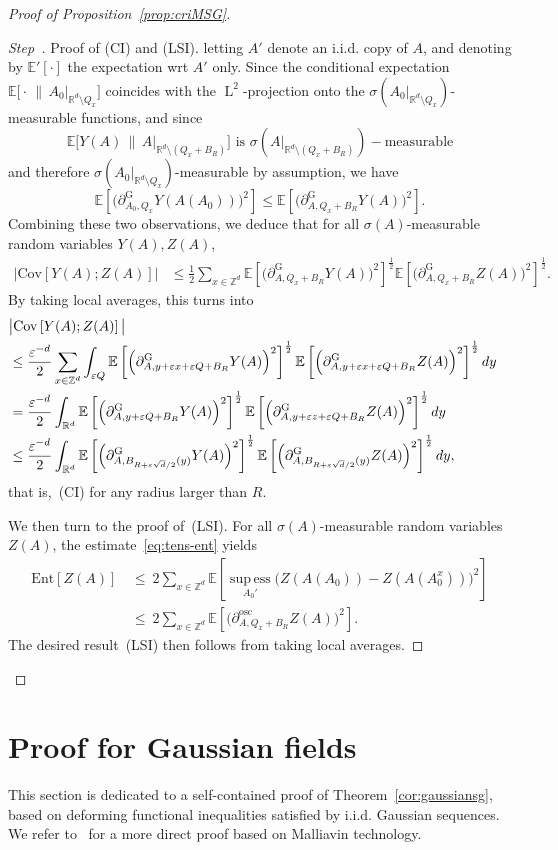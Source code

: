 \documentclass[AHL,Unicode,longabstracts]{cedram}
\newcommand{\R}{\mathbb R}
\newcommand{\Z}{\mathbb Z}
\newcommand{\expec}[1]{\mathbb{E}\left[#1 \right]}
\newcommand{\expecp}[1]{\mathbb{E}'\left[#1 \right]}
\newcommand{\expeCm}[2]{\mathbb{E}\big[#1 \,\big\|\,#2\big]}
\newcommand{\e}{\varepsilon}
\DeclareMathOperator{\supess}{sup\,ess}
\DeclareMathOperator{\Ld}{L}
\newcommand{\supessd}[1]{\mathrel{\mathop{\supess}\limits_{#1}}}
\newcommand{\parG}[1]{\partial_{#1}^{\operatorname{G}}}
\newcommand{\osc}{\partial^{\mathrm{osc}}}
\newcommand{\oscd}[1]{\mathrel{\osc_{#1}}}
\newcommand{\ent}[1]{\mathrm{Ent}\!\left[#1\right]}
\newcommand{\cov}[2]{\mathrm{Cov}\left[#1;#2\right]}
\newcounter{stepcount}
\newenvironment{step}{\refstepcounter{stepcount}\begin{proof}[Step~\thestepcount]}{\let\qed\relax\end{proof}}
\begin{document}
\begin{proof}[Proof of Proposition~\ref{prop:criMSG}]
\begin{step}{Proof of (CI) and (LSI).}
letting $A'$ denote an i.i.d. copy of $A$, and denoting by $\expecp{\cdot}$ the expectation wrt $A'$ only. Since the conditional expectation $\expeCm{\cdot}{A_0|_{\R^d\setminus Q_x}}$ coincides with the $\Ld^2$-projection onto the $\sigma(A_0|_{\R^d\setminus Q_x})$-measurable functions, and since
\[
\expeCm{Y(A)}{A|_{\R^d\setminus (Q_x+B_R)}} \text{ is }\sigma\left(A|_{\R^d\setminus(Q_x+B_R)}\right)-\text{measurable}
\]
and therefore $\sigma(A_0|_{\R^d\setminus Q_x})$-measurable by assumption, we have
\[
\expec{\Big(\parG{A_0,Q_x}Y(A(A_0))\Big)^2}\le\expec{\Big(\parG{A,Q_x+B_R}Y(A)\Big)^2}.
\]
Combining these two observations, we deduce that for all $\sigma(A)$-measurable random variables $Y(A),Z(A)$,
\begin{align*}
\big|\cov{Y(A)}{Z(A)}\big|&\le\frac12\sum_{x\in\Z^d}\expec{\Big(\parG{A,Q_x+B_R}Y(A)\Big)^2}^\frac12\expec{\Big(\parG{A,Q_x+B_R}Z(A)\Big)^2}^\frac12.
\end{align*}
By taking local averages, this turns into
\begin{align*}
\lefteqn{\big|\cov{Y(A)}{Z(A)}\big|}
\\
&\le\frac{\e^{-d}}2\sum_{x\in\Z^d}\int_{\e Q}\expec{\Big(\parG{A,y+\e x+\e Q+B_R}Y(A)\Big)^2}^\frac12\expec{\Big(\parG{A,y+\e x+\e Q+B_R}Z(A)\Big)^2}^\frac12dy\\
&=\frac{\e^{-d}}2\int_{\R^d}\expec{\Big(\parG{A,y+\e Q+B_R}Y(A)\Big)^2}^\frac12\expec{\Big(\parG{A,y+\e z+\e Q+B_R}Z(A)\Big)^2}^\frac12dy\\
&\le\frac{\e^{-d}}2\int_{\R^d}\expec{\Big(\parG{A,B_{R+\e\sqrt d/2}(y)}Y(A)\Big)^2}^\frac12\expec{\Big(\parG{A,B_{R+\e\sqrt d/2}(y)}Z(A)\Big)^2}^\frac12dy,
\end{align*}
that is,~(CI) for any radius larger than $R$.

\noindent We then turn to the proof of~(LSI). For all $\sigma(A)$-measurable random variables $Z(A)$, the estimate~\eqref{eq:tens-ent} yields
\begin{align*}
\ent{Z(A)}\,&\le~2\sum_{x\in\Z^d}\expec{\supessd{A_0'}\big(Z(A(A_0))-Z(A(A_0^{x}))\big)^2}
\\
&\le~2\sum_{x\in\Z^d}\expec{\Big(\oscd{A,Q_x+B_R}Z(A)\Big)^2}.
\end{align*}
The desired result~(LSI) then follows from taking local averages.
\end{step}
\end{proof}


\section{Proof for Gaussian fields}\label{chap:condunif}
This section is dedicated to a self-contained proof of Theorem~\ref{cor:gaussiansg}, based on deforming functional inequalities satisfied by i.i.d. Gaussian sequences. We refer to~\cite[Appendix~A]{DG3} for a more direct proof based on Malliavin technology.
\end{document}
